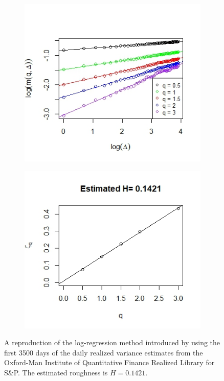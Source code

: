 \documentclass{article}
\begin{document}
\begin{figure}[htbp]
    \centering
    
    \begin{subfigure}{0.48\textwidth}
        \includegraphics[width=\linewidth]{volis1.jpeg}
    \end{subfigure}
    \hfill
    \begin{subfigure}{0.48\textwidth}
        \includegraphics[width=\linewidth]{volis2.jpeg}
    \end{subfigure}
    
    \caption{A reproduction of the log-regression method introduced by \cite{gatheral} using the first 3500 days of the daily realized variance estimates from the Oxford-Man Institute of Quantitative Finance Realized Library for S\&P. The estimated roughness is $H=0.1421$. }
    \label{fig:oxfordlog}
\end{figure}\\
\end{document}
